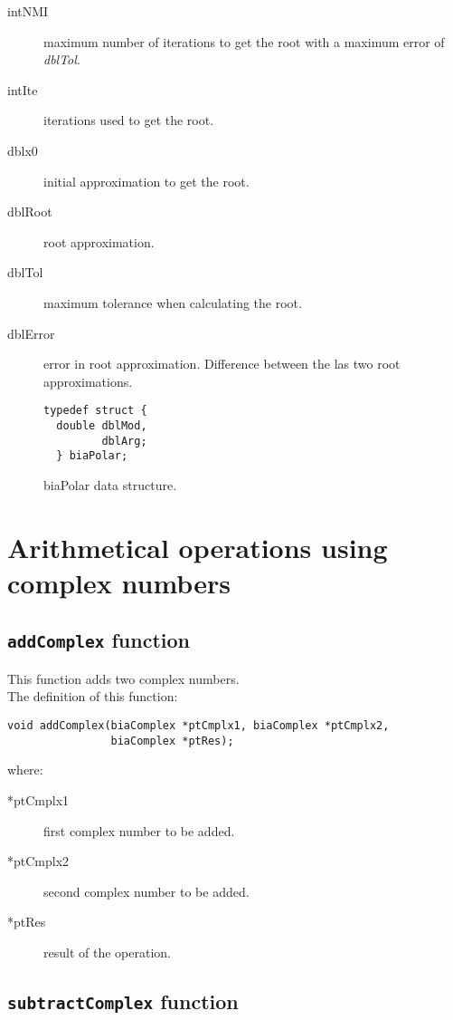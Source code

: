 \begin{description}
\item[intNMI] maximum number of iterations to get the root with a maximum error of \emph{dblTol}.
\item[intIte] iterations used to get the root.
\item[dblx0] initial approximation to get the root.
\item[dblRoot] root approximation.
\item[dblTol] maximum tolerance when calculating the root.
\item[dblError] error in root approximation. Difference between the las two root approximations.
\end{description}

\begin{figure}[!h]
\begin{verbatim}
typedef struct {
  double dblMod,
         dblArg;
  } biaPolar;
\end{verbatim}
\caption{biaPolar data structure.} \label{fig:biaPolar}
\end{figure}

\FloatBarrier

\section{Arithmetical operations using complex numbers}

\subsection{\texttt{addComplex} function}

This function adds two complex numbers.\\

The definition of this function:
%
\begin{verbatim}
void addComplex(biaComplex *ptCmplx1, biaComplex *ptCmplx2, 
                biaComplex *ptRes);
\end{verbatim}
%
where:
%
\begin{description}
\item[*ptCmplx1] first complex number to be added.
\item[*ptCmplx2] second complex number to be added.
\item[*ptRes] result of the operation.
\end{description}

\subsection{\texttt{subtractComplex} function}

